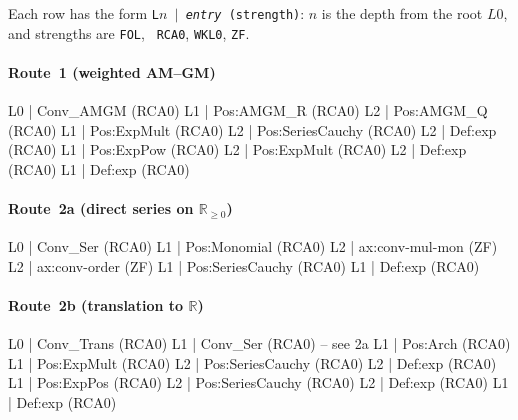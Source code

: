 \documentclass[11pt,reqno]{amsart}
\makeatletter
\providecommand{\R}{\mathbb{R}}
\theoremstyle{redplain}
\renewenvironment{quotation}
{\list{}{\listparindent\z@
		\itemindent\z@
		\rightmargin\leftmargin
		\parsep\z@}	\item\relax}
{\endlist}
\numberwithin{equation}{section}
\makeatother
\begin{document}
\label{sec:convexity-trees}

\begin{quotation}
\noindent Each row has the form \texttt{L$n$ $|$ \textit{entry} (strength)}: 
$n$ is the depth from the root $L0$, and strengths are \texttt{FOL}, \texttt{%
RCA0}, \texttt{WKL0}, \texttt{ZF}.
\end{quotation}

\paragraph{Route~1 (weighted AM--GM)}

\begin{verbatimbox}
	L0 | Conv_AMGM                          (RCA0)
	L1 |   Pos:AMGM_R                       (RCA0)
	L2 |     Pos:AMGM_Q                     (RCA0)
	L1 |   Pos:ExpMult                      (RCA0)
	L2 |     Pos:SeriesCauchy               (RCA0)
	L2 |     Def:exp                        (RCA0)
	L1 |   Pos:ExpPow                       (RCA0)
	L2 |     Pos:ExpMult                    (RCA0)
	L2 |     Def:exp                        (RCA0)
	L1 |   Def:exp                          (RCA0)
\end{verbatimbox}

\paragraph{Route~2a (direct series on \texorpdfstring{$\R_{\ge0}$}{R\_geq0})}

\begin{verbatimbox}
	L0 | Conv_Ser                           (RCA0)
	L1 |   Pos:Monomial                     (RCA0)
	L2 |     ax:conv-mul-mon                (ZF)
	L2 |     ax:conv-order                  (ZF)
	L1 |   Pos:SeriesCauchy                 (RCA0)
	L1 |   Def:exp                          (RCA0)
\end{verbatimbox}

\paragraph{Route~2b (translation to \texorpdfstring{$\R$}{R})}

\begin{verbatimbox}
	L0 | Conv_Trans                         (RCA0)
	L1 |   Conv_Ser                         (RCA0)  -- see 2a
	L1 |   Pos:Arch                         (RCA0)
	L1 |   Pos:ExpMult                      (RCA0)
	L2 |     Pos:SeriesCauchy               (RCA0)
	L2 |     Def:exp                        (RCA0)
	L1 |   Pos:ExpPos                       (RCA0)
	L2 |     Pos:SeriesCauchy               (RCA0)
	L2 |     Def:exp                        (RCA0)
	L1 |   Def:exp                          (RCA0)
\end{verbatimbox}
\end{document}
